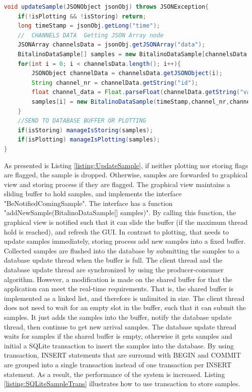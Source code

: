 \begin{minipage}{\linewidth}
\begin{lstlisting}[caption={Update real-time samples}, label = {listing:UpdateSample}, language=Java]
void updateSample(JSONObject jsonObj) throws JSONException{
    if(!isPlotting && !isStoring) return;
    long timeStamp = jsonObj.getLong("time");
    //  CHANNELS DATA  Getting JSON Array node
    JSONArray channelsData = jsonObj.getJSONArray("data");
    BitalinoDataSample[] samples = new BitalinoDataSample[channelsData.length()];
    for(int i = 0; i < channelsData.length(); i++){
        JSONObject channelData = channelsData.getJSONObject(i);
        String channel_nr = channelData.getString("id");
        float channel_data = Float.parseFloat(channelData.getString("value"));
        samples[i] = new BitalinoDataSample(timeStamp,channel_nr,channel_data);
    }
    //SEND TO DATABASE BUFFER OR PLOTTING
    if(isStoring) manageIsStoring(samples);
    if(isPlotting) manageIsPlotting(samples);
}
\end{lstlisting}
\end{minipage}
As presented is Listing \ref{listing:UpdateSample}, if neither plotting nor storing flags are flagged, the sample is dropped. Otherwise, samples are forwarded to graphical view and storing process if they are flagged. The graphical view maintains a sliding buffer to hold samples, and implements the interface "BeNotifiedComingSample". The interface has a function "addNewSample(BitalinoDataSample[] samples)". By calling this function, the graphical view is notified such that it can slide the buffer (if the maximum thread hold is reached), and refresh the GUI. In contrast to plotting, that needs to update samples immediately, storing process add new samples into a fixed buffer. Collected samples are flushed into the database by submitting the samples to a database update thread when the buffer is full. The client thread and the database update thread are synchronized by using the producer-consumer algorithm\citep{CONSUMERPRODUCER}. However, a modification is made on the shared buffer for that the application can meet the real-time requirements. That is, the shared buffer is implemented as a linked list, and therefore is unlimited in size. The client thread does not need to wait for an empty slot in the buffer, such that it can submit the samples. It just adds the samples into the buffer, notify the database update thread, then continue to get new arrival samples. The database update thread waits for samples if the shared buffer is empty, otherwise it gets samples and initial a SQLite transaction to insert the samples into the database. By using transaction, INSERT statements that are surround with BEGIN and COMMIT are grouped into a single transaction instead of one transaction per INSERT statement. As a result, the performance of the system is increased. Listing \ref{listing:SQLiteSampleTrans} illustrates how to use transaction to store samples.\\\\
